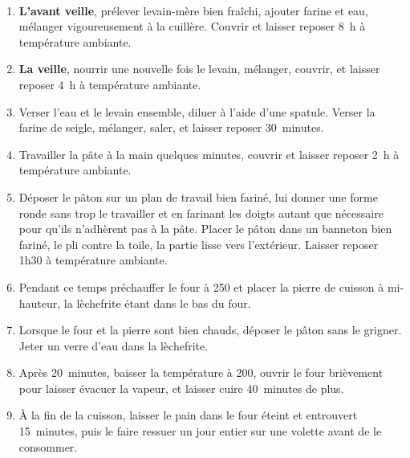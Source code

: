 \

\begin{ingredients}
  \ingrS{60}{g}{eau tiède}
\end{ingredients}

\begin{recipe}
  \begin{enumerate}

  \item \textbf{L'avant veille}, prélever levain-mère bien fraîchi,
    ajouter farine et eau, mélanger vigoureusement à la cuillère.
    Couvrir et laisser reposer 8~h à température ambiante.
    
  \item \textbf{La veille}, nourrir une nouvelle fois le levain,
    mélanger, couvrir, et laisser reposer 4~h à température ambiante.
    
  \item Verser l'eau et le levain ensemble, diluer à l'aide d'une
    spatule.  Verser la farine de seigle, mélanger, saler, et laisser
    reposer 30~minutes.
    
  \item Travailler la pâte à la main quelques minutes, couvrir et
    laisser reposer 2~h à température ambiante.
    
  \item Déposer le pâton sur un plan de travail bien fariné, lui
    donner une forme ronde sans trop le travailler et en farinant les
    doigts autant que nécessaire pour qu'ils n'adhèrent pas à la
    pâte.  Placer le pâton dans un banneton bien fariné, le pli contre
    la toile, la partie lisse vers l'extérieur.  Laisser reposer 1h30
    à température ambiante.
    
  \item Pendant ce temps préchauffer le four à 250\degreeC{} et placer la
    pierre de cuisson à mi-hauteur, la lèchefrite étant dans le bas du
    four.
    
  \item Lorsque le four et la pierre sont bien chauds, déposer le
    pâton sans le grigner.  Jeter un verre d'eau dans la lèchefrite.
    
  \item Après 20~minutes, baisser la température à 200\degreeC, ouvrir le
    four brièvement pour laisser évacuer la vapeur, et laisser cuire
    40~minutes de plus.
    
  \item À la fin de la cuisson, laisser le pain dans le four éteint et
    entrouvert 15~minutes, puis le faire ressuer un jour entier sur
    une volette avant de le consommer.
    

  \end{enumerate}
\end{recipe}

